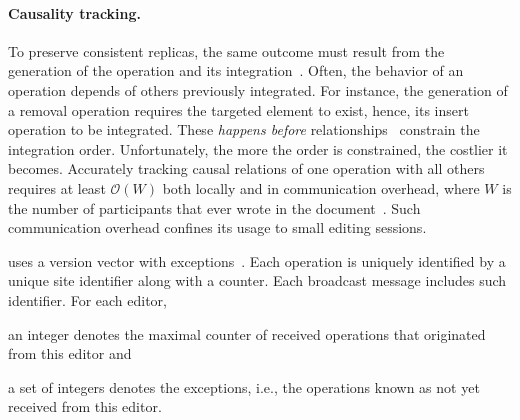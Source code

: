 


\paragraph{Causality tracking.}
To preserve consistent replicas, the same outcome must result from the
generation of the operation and its integration~\cite{sun1998achieving}. Often,
the behavior of an operation depends of others previously integrated. For
instance, the generation of a removal operation requires the targeted element to
exist, hence, its insert operation to be integrated. These \emph{happens before}
relationships~\cite{lamport1978time} constrain the integration order.
Unfortunately, the more the order is constrained, the costlier it
becomes. Accurately tracking causal relations of one operation with all others
requires at least $\mathcal{O}(W)$ both locally and in communication overhead,
where $W$ is the number of participants that ever wrote in the
document~\cite{charronbost1991concerning}. Such communication overhead confines
its usage to small editing sessions.

\CRATE uses a version vector with exceptions~\cite{malkhi2007concise,
  mukund2014optimized}. Each operation is uniquely identified by a unique site
identifier along with a counter. Each broadcast message includes such
identifier. For each editor,
\begin{inparaenum}[(i)]
\item an integer denotes the maximal counter of received operations that
  originated from this editor and
\item a set of integers denotes the exceptions, i.e., the operations known as
  not yet received from this editor.
\end{inparaenum}

